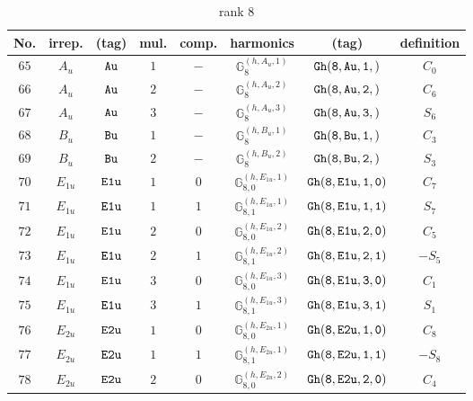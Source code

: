 \documentclass[fleqn,8pt]{jsarticle}
\begin{document}
\begin{table}[ht!]
\begin{center}
\caption{rank 8}
\renewcommand{\arraystretch}{1.3}
\begin{tabular}{cccccccc} \hline \hline
No. & irrep. & (tag) & mul. & comp. & harmonics & (tag) & definition \\ \hline
$ 65 $ & $ A_{u} $ & $ {\tt Au} $ & $ 1 $ & $ - $ & $ \mathbb{G}_{8}^{(h,A_{u},1)} $ & $ {\tt Gh(8,Au,1,)} $ & $ C_{0} $ \\
$ 66 $ & $ A_{u} $ & $ {\tt Au} $ & $ 2 $ & $ - $ & $ \mathbb{G}_{8}^{(h,A_{u},2)} $ & $ {\tt Gh(8,Au,2,)} $ & $ C_{6} $ \\
$ 67 $ & $ A_{u} $ & $ {\tt Au} $ & $ 3 $ & $ - $ & $ \mathbb{G}_{8}^{(h,A_{u},3)} $ & $ {\tt Gh(8,Au,3,)} $ & $ S_{6} $ \\
$ 68 $ & $ B_{u} $ & $ {\tt Bu} $ & $ 1 $ & $ - $ & $ \mathbb{G}_{8}^{(h,B_{u},1)} $ & $ {\tt Gh(8,Bu,1,)} $ & $ C_{3} $ \\
$ 69 $ & $ B_{u} $ & $ {\tt Bu} $ & $ 2 $ & $ - $ & $ \mathbb{G}_{8}^{(h,B_{u},2)} $ & $ {\tt Gh(8,Bu,2,)} $ & $ S_{3} $ \\
$ 70 $ & $ E_{1u} $ & $ {\tt E1u} $ & $ 1 $ & $ 0 $ & $ \mathbb{G}_{8,0}^{(h,E_{1u},1)} $ & $ {\tt Gh(8,E1u,1,0)} $ & $ C_{7} $ \\
$ 71 $ & $ E_{1u} $ & $ {\tt E1u} $ & $ 1 $ & $ 1 $ & $ \mathbb{G}_{8,1}^{(h,E_{1u},1)} $ & $ {\tt Gh(8,E1u,1,1)} $ & $ S_{7} $ \\
$ 72 $ & $ E_{1u} $ & $ {\tt E1u} $ & $ 2 $ & $ 0 $ & $ \mathbb{G}_{8,0}^{(h,E_{1u},2)} $ & $ {\tt Gh(8,E1u,2,0)} $ & $ C_{5} $ \\
$ 73 $ & $ E_{1u} $ & $ {\tt E1u} $ & $ 2 $ & $ 1 $ & $ \mathbb{G}_{8,1}^{(h,E_{1u},2)} $ & $ {\tt Gh(8,E1u,2,1)} $ & $ - S_{5} $ \\
$ 74 $ & $ E_{1u} $ & $ {\tt E1u} $ & $ 3 $ & $ 0 $ & $ \mathbb{G}_{8,0}^{(h,E_{1u},3)} $ & $ {\tt Gh(8,E1u,3,0)} $ & $ C_{1} $ \\
$ 75 $ & $ E_{1u} $ & $ {\tt E1u} $ & $ 3 $ & $ 1 $ & $ \mathbb{G}_{8,1}^{(h,E_{1u},3)} $ & $ {\tt Gh(8,E1u,3,1)} $ & $ S_{1} $ \\
$ 76 $ & $ E_{2u} $ & $ {\tt E2u} $ & $ 1 $ & $ 0 $ & $ \mathbb{G}_{8,0}^{(h,E_{2u},1)} $ & $ {\tt Gh(8,E2u,1,0)} $ & $ C_{8} $ \\
$ 77 $ & $ E_{2u} $ & $ {\tt E2u} $ & $ 1 $ & $ 1 $ & $ \mathbb{G}_{8,1}^{(h,E_{2u},1)} $ & $ {\tt Gh(8,E2u,1,1)} $ & $ - S_{8} $ \\
$ 78 $ & $ E_{2u} $ & $ {\tt E2u} $ & $ 2 $ & $ 0 $ & $ \mathbb{G}_{8,0}^{(h,E_{2u},2)} $ & $ {\tt Gh(8,E2u,2,0)} $ & $ C_{4} $ \\

\end{tabular}
\end{center}
\end{table}
\end{document}

